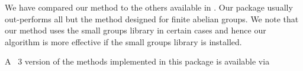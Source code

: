 We have compared our method to the others available in {\GAP}.
Our package usually out-performs all but the method designed 
for finite abelian groups. We note that our method uses the 
small groups library in certain cases and hence our algorithm
is more effective if the small groups library is installed.

A {\GAP}~3 version of the methods implemented in this package 
is available via 

